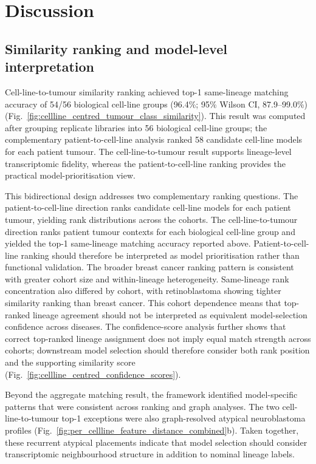 \section{Discussion}

\subsection{Similarity ranking and model-level interpretation}

Cell-line-to-tumour similarity ranking achieved top-1 same-lineage matching
accuracy of 54/56 biological cell-line groups (96.4\%; 95\% Wilson CI,
87.9--99.0\%) (Fig.~\ref{fig:cellline_centred_tumour_class_similarity}).
This result was computed after grouping replicate libraries into 56 biological
cell-line groups; the complementary patient-to-cell-line analysis ranked 58
candidate cell-line models for each patient tumour. The cell-line-to-tumour
result supports lineage-level transcriptomic fidelity, whereas the
patient-to-cell-line ranking provides the practical model-prioritisation view.

This bidirectional design addresses two complementary ranking questions.
The patient-to-cell-line direction ranks candidate cell-line models for each
patient tumour, yielding rank distributions across the cohorts. The
cell-line-to-tumour direction ranks patient tumour contexts for each biological
cell-line group and yielded the top-1 same-lineage matching accuracy reported
above. Patient-to-cell-line ranking should therefore be interpreted as model
prioritisation rather than functional validation. The broader breast cancer
ranking pattern is consistent with greater cohort size and within-lineage
heterogeneity. Same-lineage rank concentration also differed by cohort, with
retinoblastoma showing tighter similarity ranking than breast cancer. This cohort
dependence means that top-ranked lineage agreement should not be interpreted as
equivalent model-selection confidence across diseases. The confidence-score analysis further shows that
correct top-ranked lineage assignment does not imply equal match strength
across cohorts; downstream model selection should therefore consider both rank
position and the supporting similarity score
(Fig.~\ref{fig:cellline_centred_confidence_scores}).

Beyond the aggregate matching result, the framework identified model-specific
patterns that were consistent across ranking and graph analyses. The two
cell-line-to-tumour top-1 exceptions were also graph-resolved atypical
neuroblastoma profiles (Fig.~\ref{fig:per_cellline_feature_distance_combined}b).
Taken together, these recurrent atypical placements indicate that model
selection should consider transcriptomic neighbourhood structure in addition to
nominal lineage labels.

